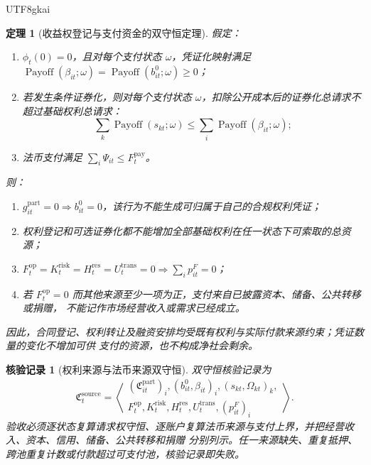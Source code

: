 \documentclass[12pt,a4paper,openany]{report}
\newtheorem{theorem}{定理}[chapter]
\newtheorem{Certificate}{核验记录}[chapter]
\begin{document}
\begin{CJK*}{UTF8}{gkai}
\begin{theorem}[收益权登记与支付资金的双守恒定理]
\label{thm:rights-payment-conservation}
假定：
\begin{enumerate}[label=\textup{(\roman*)},leftmargin=3em]
  \item \(\phi_t(0)=0\)，且对每个支付状态 \(\omega\)，凭证化映射满足
  \(\operatorname{Payoff}(\beta_{it};\omega)=
  \operatorname{Payoff}(b_{it}^{0};\omega)\ge0\)；
  \item 若发生条件证券化，则对每个支付状态 \(\omega\)，扣除公开成本后的证券化总请求不超过基础权利总请求：
  \[
    \sum_k\operatorname{Payoff}(s_{kt};\omega)
    \le
    \sum_i\operatorname{Payoff}(\beta_{it};\omega);
  \]
  \item 法币支付满足 \(\sum_i\Psi_{it}\le F_t^{\mathrm{pay}}\)。
\end{enumerate}
则：
\begin{enumerate}[label=\textup{(\alph*)},leftmargin=3em]
  \item \(g_{it}^{\mathrm{part}}=0\Longrightarrow b_{it}^0=0\)，该行为不能生成可归属于自己的合规权利凭证；
  \item 权利登记和可选证券化都不能增加全部基础权利在任一状态下可索取的总资源；
  \item \(F_t^{\mathrm{op}}=K_t^{\mathrm{risk}}=H_t^{\mathrm{res}}=U_t^{\mathrm{trans}}=0\Longrightarrow
  \sum_i p_{it}^{F}=0\)；
  \item 若 \(F_t^{\mathrm{op}}=0\) 而其他来源至少一项为正，支付来自已披露资本、储备、公共转移或捐赠，
  不能记作市场经营收入或需求已经成立。
\end{enumerate}
因此，合同登记、权利转让及融资安排均受既有权利与实际付款来源约束；凭证数量的变化不增加可供
支付的资源，也不构成净社会剩余。
\end{theorem}

\begin{Certificate}[权利来源与法币来源双守恒]
\label{cert:right-fiat-dual-conservation}
双守恒核验记录为
\[
  \mathfrak C_{t}^{\mathrm{source}}
  =\left\langle
  \begin{gathered}
  (\mathfrak C_{it}^{\mathrm{part}})_i,
  (b_{it}^{0},\beta_{it})_i,
  (s_{kt},\Omega_{kt})_k,\\
  F_t^{\mathrm{op}},K_t^{\mathrm{risk}},H_t^{\mathrm{res}},U_t^{\mathrm{trans}},
  (p_{it}^{F})_i
  \end{gathered}
  \right\rangle.
\]
验收必须逐状态复算请求权守恒、逐账户复算法币来源与支付上界，并把经营收入、资本、信用、储备、公共转移和捐赠
分别列示。任一来源缺失、重复抵押、跨池重复计数或付款超过可支付池，核验记录即失败。
\end{Certificate}


\end{CJK*}
\end{document}
